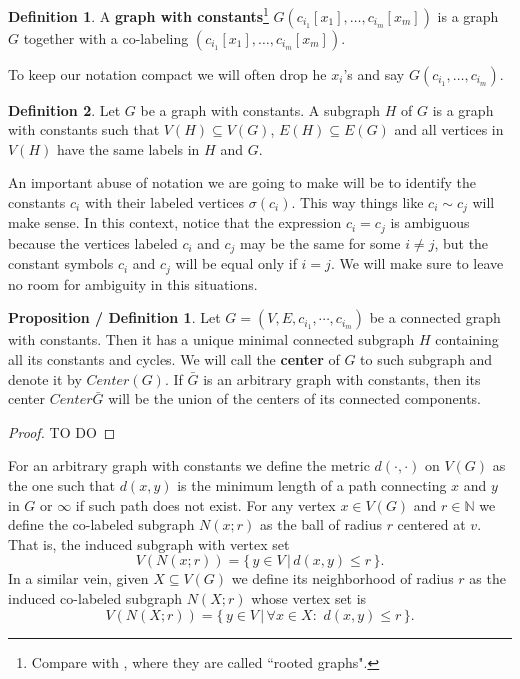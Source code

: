 \documentclass[11pt,notitlepage]{report}
\theoremstyle{definition}
\newtheorem{definition}{Definition}[chapter]
\newtheorem{propdef}{Proposition / Definition}[chapter]
\newcommand{\N}{\mathbb{N}}
\newcommand{\clist}{c_{i_1}, \cdots, c_{i_m}}
\begin{document}
\begin{definition} 
	A \textbf{graph with constants}\footnote{
		Compare with \cite{lynch1992probabilities}, where they are called ``rooted graphs". 
		}
	$G(c_{i_1}[x_1],\dots, c_{i_m}[x_m])$ 
	is a graph $G$ together with a co-labeling 
	$(c_{i_1}[x_1],\dots, c_{i_m}[x_m])$. 
\end{definition}

To keep our notation compact we will often drop 
he $x_i$'s and say $G(c_{i_1},\dots, c_{i_m})$. \par

\begin{definition}
Let $G$ be a graph with constants. A subgraph $H$ of $G$ is
a graph with constants such that $V(H)\subseteq V(G)$, $E(H)\subseteq E(G)$ and 
all vertices in $V(H)$ have the same labels in $H$ and $G$. 
\end{definition}


An important abuse of notation we are going to make
will be to identify the constants $c_i$ with their labeled
vertices $\sigma(c_i)$. This way things like $c_i\sim c_j$ 
will make sense. In this context, notice that the expression
$c_i=c_j$ is ambiguous because the vertices labeled $c_i$ and $c_j$ 
may be the same for some $i\neq j$, but 
the constant symbols $c_i$ and $c_j$ will be equal only if $i=j$. 
We will make sure to leave no room for ambiguity in this situations. \par


\begin{propdef}
	Let $G=(V,E,\clist)$ be a connected graph with constants. Then it has a unique minimal
	connected subgraph $H$ containing all its constants and cycles.
	We will call the \textbf{center} of $G$ to such subgraph and denote it by $Center(G)$.
	If $\bar{G}$ is an arbitrary graph with constants, then its center $Center{\bar{G}}$ will
	be the union of the centers of its connected components. 
\end{propdef}
\begin{proof}
	TO DO
\end{proof}

For an arbitrary graph with constants we define the metric $d(\cdot,\cdot)$ on $V(G)$ 
as the one such that $d(x,y)$ is the minimum length of a path connecting
$x$ and $y$ in $G$ or $\infty$ if such path does not exist. 
For any vertex $x\in V(G)$ and $r\in \N$ we define the co-labeled
subgraph $N(x;r)$ as the ball of radius $r$ centered at $v$. 
That is, the induced subgraph with vertex set
\[ V(N(x;r))= \{\, y\in V \, | \, d(x,y)\leq  r \,	\}.\] 
In a similar vein, given $X\subseteq V(G)$ we define its neighborhood of radius $r$ as
the induced co-labeled subgraph $N(X;r)$ whose vertex set is
\[ V(N(X;r))= \{\, y\in V \, | \, \forall x\in X: \, \,  d(x,y)\leq  r \,	\}.\]  
\par
\end{document}
